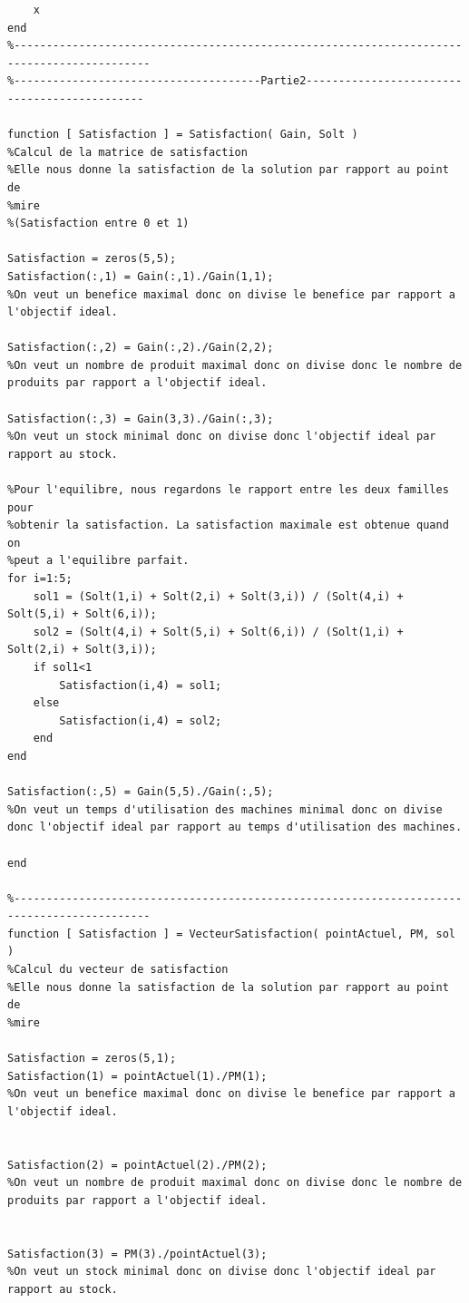 \documentclass[a4paper, 11pt]{article}
\begin{document}
\begin{lstlisting}
    x
end
%-------------------------------------------------------------------------------------------
%--------------------------------------Partie2---------------------------------------------

function [ Satisfaction ] = Satisfaction( Gain, Solt )
%Calcul de la matrice de satisfaction
%Elle nous donne la satisfaction de la solution par rapport au point de
%mire
%(Satisfaction entre 0 et 1)

Satisfaction = zeros(5,5);
Satisfaction(:,1) = Gain(:,1)./Gain(1,1);
%On veut un benefice maximal donc on divise le benefice par rapport a l'objectif ideal.

Satisfaction(:,2) = Gain(:,2)./Gain(2,2); 
%On veut un nombre de produit maximal donc on divise donc le nombre de produits par rapport a l'objectif ideal.

Satisfaction(:,3) = Gain(3,3)./Gain(:,3);
%On veut un stock minimal donc on divise donc l'objectif ideal par rapport au stock.

%Pour l'equilibre, nous regardons le rapport entre les deux familles pour
%obtenir la satisfaction. La satisfaction maximale est obtenue quand on
%peut a l'equilibre parfait.
for i=1:5;
    sol1 = (Solt(1,i) + Solt(2,i) + Solt(3,i)) / (Solt(4,i) + Solt(5,i) + Solt(6,i));
    sol2 = (Solt(4,i) + Solt(5,i) + Solt(6,i)) / (Solt(1,i) + Solt(2,i) + Solt(3,i));
    if sol1<1
        Satisfaction(i,4) = sol1;
    else
        Satisfaction(i,4) = sol2;
    end
end

Satisfaction(:,5) = Gain(5,5)./Gain(:,5);
%On veut un temps d'utilisation des machines minimal donc on divise donc l'objectif ideal par rapport au temps d'utilisation des machines.

end

%-------------------------------------------------------------------------------------------
function [ Satisfaction ] = VecteurSatisfaction( pointActuel, PM, sol )
%Calcul du vecteur de satisfaction
%Elle nous donne la satisfaction de la solution par rapport au point de
%mire

Satisfaction = zeros(5,1);
Satisfaction(1) = pointActuel(1)./PM(1);
%On veut un benefice maximal donc on divise le benefice par rapport a l'objectif ideal.


Satisfaction(2) = pointActuel(2)./PM(2);
%On veut un nombre de produit maximal donc on divise donc le nombre de produits par rapport a l'objectif ideal.


Satisfaction(3) = PM(3)./pointActuel(3);
%On veut un stock minimal donc on divise donc l'objectif ideal par rapport au stock.



\end{lstlisting}
\end{document}
